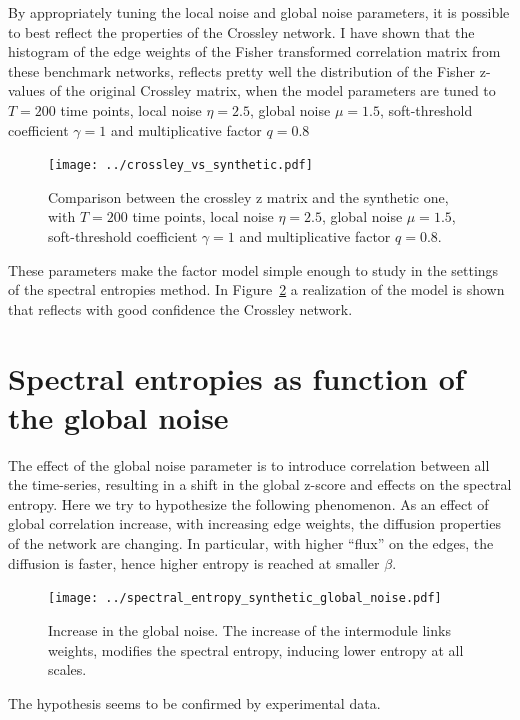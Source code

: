 \documentclass[a4paper]{article}
\begin{document}
By appropriately tuning the local noise and global noise parameters, it is possible to best reflect the properties of the Crossley network.
I have shown that the histogram of the edge weights of the Fisher transformed correlation matrix from these benchmark networks, reflects pretty well the distribution of the Fisher z-values of the original Crossley matrix, when the model parameters are tuned to $T=200$ time points, local noise $\eta=2.5$, global noise $\mu=1.5$, soft-threshold coefficient $\gamma=1$ and multiplicative factor $q=0.8$
\begin{figure}
\texttt{[image: ../crossley\_vs\_synthetic.pdf]}
\caption{Comparison between the crossley z matrix and the synthetic one, with $T=200$ time points, local noise $\eta=2.5$, global noise $\mu=1.5$, soft-threshold coefficient $\gamma=1$ and multiplicative factor $q=0.8$.}
\label{fig:benchmark_network}
\end{figure}

These parameters make the factor model simple enough to study in the settings of the spectral entropies method. In Figure~\ref{fig:benchmark_network} a realization of the model is shown that reflects with good confidence the Crossley network.

\section{Spectral entropies as function of the global noise}
The effect of the global noise parameter is to introduce correlation between all the time-series, resulting in a shift in the global z-score and effects on the spectral entropy. 
Here we try to hypothesize the following phenomenon. As an effect of global correlation increase, with increasing edge weights, the diffusion properties of the network are changing. In particular, with higher ``flux'' on the edges, the diffusion is faster, hence higher entropy is reached at smaller $\beta$.

\begin{figure}
\texttt{[image: ../spectral\_entropy\_synthetic\_global\_noise.pdf]}
\caption{Increase in the global noise. The increase of the intermodule links weights, modifies the spectral entropy, inducing lower entropy at all scales.}
\label{fig:benchmark_network}
\end{figure}
The hypothesis seems to be confirmed by experimental data.

\newpage
\end{document}
